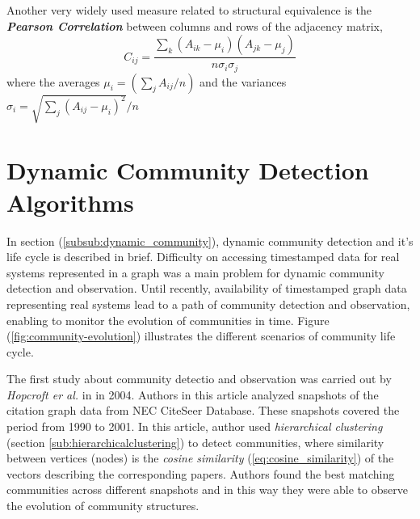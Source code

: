 {Another very widely used measure related to structural equivalence is the \textbf{\textit{Pearson Correlation}} between columns and rows of the adjacency matrix,
\begin{equation}
C_{ij} = \dfrac{\sum\limits_{k} (A_{ik} - \mu_i) (A_{jk} - \mu_j)}{n \sigma_i \sigma_j}
\end{equation}
where the averages $\mu_i = (\sum\limits_j A_{ij} / n)$ and the variances $\sigma_i = \sqrt{\sum\limits_j (A_{ij} - \mu_i)^2} / n$

\section{Dynamic Community Detection Algorithms}\label{sec:dynamic_community_algorithms}
In section (\ref{subsub:dynamic_community}), dynamic community detection and it's life cycle is described in brief. Difficulty on accessing timestamped data for real systems represented in a graph was a main problem for dynamic community detection and observation. Until recently, availability of timestamped graph data representing real systems lead to a path of community detection and observation, enabling to monitor the evolution of communities in time. Figure (\ref{fig:community-evolution}) illustrates the different scenarios of community life cycle.

The first study about community detectio and observation was carried out by \textit{Hopcroft er al.} in  \cite{ref-52} in 2004. Authors in this article analyzed snapshots of the citation graph data from NEC CiteSeer Database. These snapshots covered the period from 1990 to 2001. In this article, author used \textit{hierarchical clustering} (section \ref{sub:hierarchicalclustering}) to detect communities, where similarity between vertices (nodes) is the \textit{cosine similarity} (\ref{eq:cosine_similarity}) of the vectors describing the corresponding papers. Authors found the best matching communities across different snapshots and in this way they were able to observe the evolution of community structures.

}
